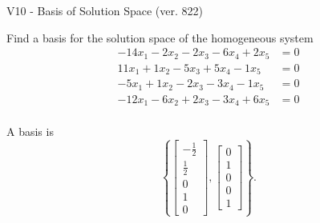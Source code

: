 \begin{exercise}
  \begin{exerciseTitle}V10 - Basis of Solution Space (ver. 822)\end{exerciseTitle}
  \begin{exerciseStatement}
    Find a basis for the solution space of the homogeneous system 
\begin{align*}
 -14 x_ 1 -2 x_ 2 -2 x_ 3 -6 x_ 4 + 2 x_ 5 &= 0  \\ 
  11 x_ 1 + 1 x_ 2 -5 x_ 3 + 5 x_ 4 -1 x_ 5 &= 0  \\ 
  -5 x_ 1 + 1 x_ 2 -2 x_ 3 -3 x_ 4 -1 x_ 5 &= 0  \\ 
  -12 x_ 1 -6 x_ 2 + 2 x_ 3 -3 x_ 4 + 6 x_ 5 &= 0  \\ 
 \end{align*}


 
  \end{exerciseStatement}

  \begin{exerciseAnswer}
   A basis is   
\[\left\{\left[\begin{array}{c}
-\frac{1}{2} \\
\frac{1}{2} \\
0 \\
1 \\
0
\end{array}\right] , \left[\begin{array}{c}
0 \\
1 \\
0 \\
0 \\
1
\end{array}\right]\right\}.\]

  


  \end{exerciseAnswer}
\end{exercise}